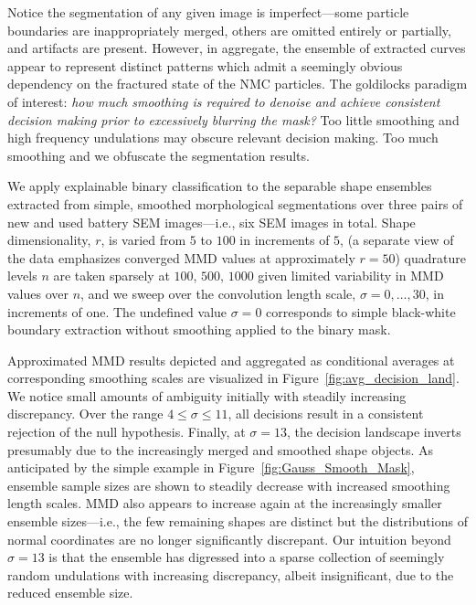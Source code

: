 \documentclass[pdflatex,iicol]{sn-jnl}%
\theoremstyle{thmstyleone}%
\theoremstyle{thmstyletwo}%
\theoremstyle{thmstylethree}%
\begin{document}
Notice the segmentation of any given image is imperfect---some particle boundaries are inappropriately merged, others are omitted entirely or partially, and artifacts are present. However, in aggregate, the ensemble of extracted curves appear to represent distinct patterns which admit a seemingly obvious dependency on the fractured state of the NMC particles. The goldilocks paradigm of interest: \textit{how much smoothing is required to denoise and achieve consistent decision making prior to excessively blurring the mask?} Too little smoothing and high frequency undulations may obscure relevant decision making. Too much smoothing and we obfuscate the segmentation results.

We apply explainable binary classification to the separable shape ensembles extracted from simple, smoothed morphological segmentations over three pairs of new and used battery SEM images---i.e., six SEM images in total. Shape dimensionality, $r$, is varied from $5$ to $100$ in increments of $5$, (a separate view of the data emphasizes converged MMD values at approximately $r=50$) quadrature levels $n$ are taken sparsely at $100$, $500$, $1000$ given limited variability in MMD values over $n$, and we sweep over the convolution length scale, $\sigma=0,\dots,30$, in increments of one. The undefined value $\sigma = 0$ corresponds to simple black-white boundary extraction without smoothing applied to the binary mask. 

Approximated MMD results depicted and aggregated as conditional averages at corresponding smoothing scales are visualized in Figure~\ref{fig:avg_decision_land}. We notice small amounts of ambiguity initially with steadily increasing discrepancy. Over the range $4\leq \sigma \leq 11$, all decisions result in a consistent rejection of the null hypothesis. Finally, at $\sigma = 13$, the decision landscape inverts presumably due to the increasingly merged and smoothed shape objects. As anticipated by the simple example in Figure~\ref{fig:Gauss_Smooth_Mask}, ensemble sample sizes are shown to steadily decrease with increased smoothing length scales. MMD also appears to increase again at the increasingly smaller ensemble sizes---i.e., the few remaining shapes are distinct but the distributions of normal coordinates are no longer significantly discrepant. Our intuition beyond $\sigma =13$ is that the ensemble has digressed into a sparse collection of seemingly random undulations with increasing discrepancy, albeit insignificant, due to the reduced ensemble size.
\end{document}
